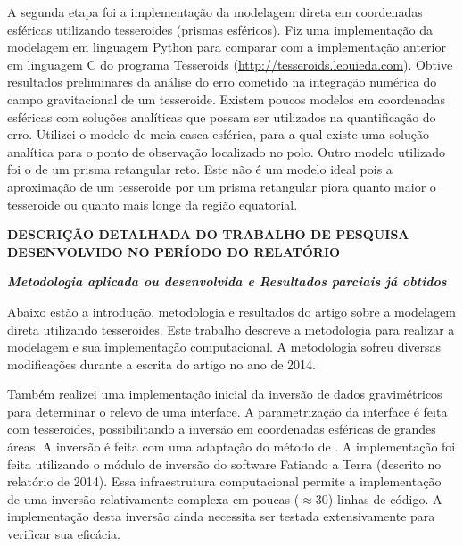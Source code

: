 \documentclass[12pt,a4paper]{article}
\begin{document}
A segunda etapa foi a implementação da modelagem direta em coordenadas
esféricas utilizando tesseroides (prismas esféricos).
Fiz uma implementação da modelagem em linguagem Python para comparar com a
implementação anterior em linguagem C do programa Tesseroids
(\href{http://tesseroids.leouieda.com}{http://tesseroids.leouieda.com}).
Obtive resultados preliminares da análise do erro cometido na integração
numérica do campo gravitacional de um tesseroide.
Existem poucos modelos em coordenadas esféricas com soluções analíticas que
possam ser utilizados na quantificação do erro.
Utilizei o modelo de meia casca esférica, para a qual existe uma solução
analítica para o ponto de observação localizado no polo.
Outro modelo utilizado foi o de um prisma retangular reto.
Este não é um modelo ideal pois a aproximação de um tesseroide por um prisma
retangular piora quanto maior o tesseroide ou quanto mais longe da região
equatorial.



\newpage

\begin{center}
\textbf{\large DESCRIÇÃO DETALHADA DO TRABALHO DE PESQUISA DESENVOLVIDO NO
PERÍODO DO RELATÓRIO}
\end{center}

\vspace{1cm}

{\centering\bfseries\itshape
Metodologia aplicada ou desenvolvida
e
Resultados parciais já obtidos
\par}

\bigskip

Abaixo estão a introdução, metodologia e resultados do artigo sobre a
modelagem direta utilizando tesseroides.
Este trabalho descreve a metodologia para realizar a modelagem e sua
implementação computacional.
A metodologia sofreu diversas modificações durante a escrita do artigo
no ano de 2014.

Também realizei uma implementação inicial da inversão de dados gravimétricos
para determinar o relevo de uma interface.
A parametrização da interface é feita com tesseroides, possibilitando a
inversão em coordenadas esféricas de grandes áreas.
A inversão é feita com uma adaptação do método de \citet{Silva2014}.
A implementação foi feita utilizando o módulo de inversão do software
Fatiando a Terra (descrito no relatório de 2014).
Essa infraestrutura computacional permite a implementação de uma inversão
relativamente complexa em poucas ($\approx30$) linhas de código.
A implementação desta inversão ainda necessita ser testada extensivamente
para verificar sua eficácia.
\end{document}

